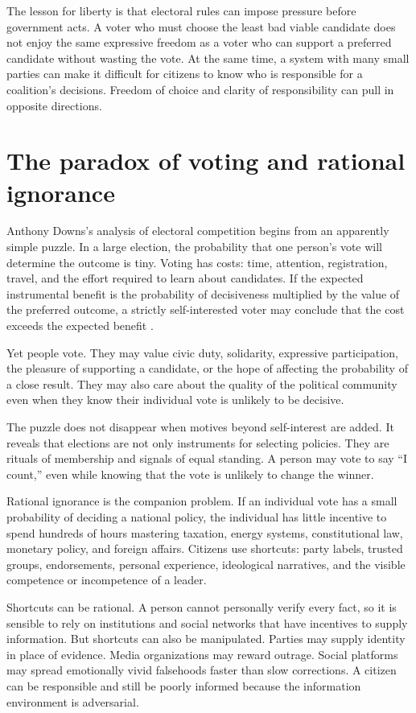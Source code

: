 ﻿\documentclass[12pt,a4paper]{book}
\begin{document}
The lesson for liberty is that electoral rules can impose pressure before
government acts.  A voter who must choose the least bad viable candidate
does not enjoy the same expressive freedom as a voter who can support a
preferred candidate without wasting the vote.  At the same time, a system
with many small parties can make it difficult for citizens to know who is
responsible for a coalition's decisions.  Freedom of choice and clarity of
responsibility can pull in opposite directions.

\section{The paradox of voting and rational ignorance}

Anthony Downs's analysis of electoral competition begins from an apparently
simple puzzle.  In a large election, the probability that one person's vote
will determine the outcome is tiny.  Voting has costs: time, attention,
registration, travel, and the effort required to learn about candidates.
If the expected instrumental benefit is the probability of decisiveness
multiplied by the value of the preferred outcome, a strictly self-interested
voter may conclude that the cost exceeds the expected benefit
\cite{Downs1957}.

Yet people vote.  They may value civic duty, solidarity, expressive
participation, the pleasure of supporting a candidate, or the hope of
affecting the probability of a close result.  They may also care about the
quality of the political community even when they know their individual
vote is unlikely to be decisive.

The puzzle does not disappear when motives beyond self-interest are added.
It reveals that elections are not only instruments for selecting policies.
They are rituals of membership and signals of equal standing.  A person may
vote to say ``I count,'' even while knowing that the vote is unlikely to
change the winner.

Rational ignorance is the companion problem.  If an individual vote has a
small probability of deciding a national policy, the individual has little
incentive to spend hundreds of hours mastering taxation, energy systems,
constitutional law, monetary policy, and foreign affairs.  Citizens use
shortcuts: party labels, trusted groups, endorsements, personal experience,
ideological narratives, and the visible competence or incompetence of a
leader.

Shortcuts can be rational.  A person cannot personally verify every fact,
so it is sensible to rely on institutions and social networks that have
incentives to supply information.  But shortcuts can also be manipulated.
Parties may supply identity in place of evidence.  Media organizations may
reward outrage.  Social platforms may spread emotionally vivid falsehoods
faster than slow corrections.  A citizen can be responsible and still be
poorly informed because the information environment is adversarial.
\end{document}
